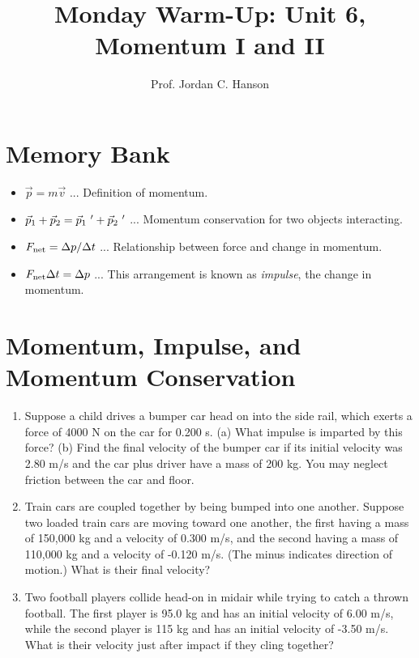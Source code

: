 \documentclass{article}
\begin{document}
\twocolumn

\title{Monday Warm-Up: Unit 6, Momentum I and II}
\author{Prof. Jordan C. Hanson}

\maketitle

\section{Memory Bank}

\begin{itemize}
\item $\vec{p} = m\vec{v}$ ... Definition of momentum.
\item $\vec{p}_{\rm 1} + \vec{p}_{\rm 2} = \vec{p}_{\rm 1}~' + \vec{p}_{\rm 2}~'$ ... Momentum conservation for two objects interacting.
\item $F_{\rm net} = \Delta p/\Delta t$ ... Relationship between force and change in momentum.
\item $F_{\rm net}\Delta t = \Delta p$ ... This arrangement is known as \textit{impulse}, the change in momentum.
\end{itemize}

\section{Momentum, Impulse, and Momentum Conservation}

\begin{enumerate}
\item Suppose a child drives a bumper car head on into the side rail, which exerts a force of 4000 N on the car for 0.200 s. (a) What impulse is imparted by this force? (b) Find the final velocity of the bumper car if its initial velocity was 2.80 m/s and the car plus driver have a mass of 200 kg. You may neglect friction between the car and floor. \\ \vspace{4cm}
\item Train cars are coupled together by being bumped into one another. Suppose two loaded train cars are moving toward one another, the first having a mass of 150,000 kg and a velocity of 0.300 m/s, and the second having a mass of 110,000 kg and a velocity of -0.120 m/s. (The minus indicates direction of motion.) What is their final velocity? \\ \vspace{4cm}
\item Two football players collide head-on in midair while trying to catch a thrown football. The first player is 95.0 kg and has an initial velocity of 6.00 m/s, while the second player is 115 kg and has an initial velocity of -3.50 m/s. What is their velocity just after impact if they cling together? \\ \vspace{4cm}
\end{enumerate}
\end{document}
